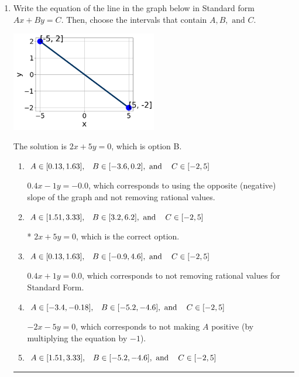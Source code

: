 \documentclass{extbook}[14pt]
\newcommand{\litem}[1]{\item #1

\rule{\textwidth}{0.4pt}}
\begin{document}
\begin{enumerate}\litem{
Write the equation of the line in the graph below in Standard form $Ax+By=C$. Then, choose the intervals that contain $A, B, \text{ and } C$.

\begin{center}
    \includegraphics[width=0.5\textwidth]{../Figures/linearGraphToStandardB.png}
\end{center}


The solution is \( 2x + 5y = 0 \), which is option B.\begin{enumerate}[label=\Alph*.]
\item \( A \in [0.13, 1.63], \hspace{3mm} B \in [-3.6, 0.2], \text{ and } \hspace{3mm} C \in [-2, 5] \)

 $0.4x - 1y = -0.0$, which corresponds to using the opposite (negative) slope of the graph and not removing rational values.
\item \( A \in [1.51, 3.33], \hspace{3mm} B \in [3.2, 6.2], \text{ and } \hspace{3mm} C \in [-2, 5] \)

* $2x + 5y = 0$, which is the correct option.
\item \( A \in [0.13, 1.63], \hspace{3mm} B \in [-0.9, 4.6], \text{ and } \hspace{3mm} C \in [-2, 5] \)

 $0.4x + 1y = 0.0$, which corresponds to not removing rational values for Standard Form.
\item \( A \in [-3.4, -0.18], \hspace{3mm} B \in [-5.2, -4.6], \text{ and } \hspace{3mm} C \in [-2, 5] \)

 $-2x - 5y = 0$, which corresponds to not making $A$ positive (by multiplying the equation by $-1$).
\item \( A \in [1.51, 3.33], \hspace{3mm} B \in [-5.2, -4.6], \text{ and } \hspace{3mm} C \in [-2, 5] \)


\end{enumerate}}
\end{enumerate}
\end{document}

